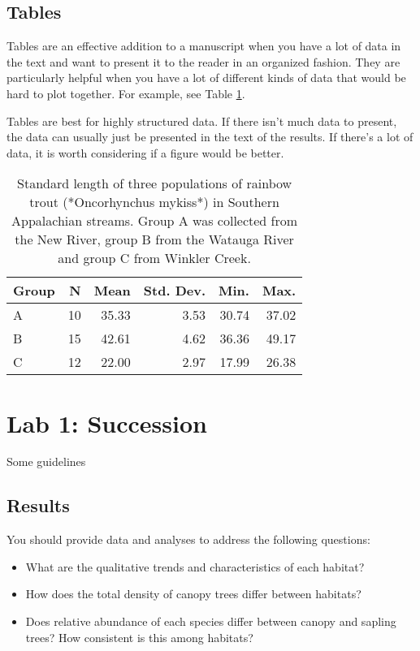 \documentclass[]{book}
\providecommand{\tightlist}{%
  \setlength{\itemsep}{0pt}\setlength{\parskip}{0pt}}
\begin{document}
\section{Tables}\label{tables}

Tables are an effective addition to a manuscript when you have a lot of
data in the text and want to present it to the reader in an organized
fashion. They are particularly helpful when you have a lot of different
kinds of data that would be hard to plot together. For example, see
Table \ref{tab:table1}.

Tables are best for highly structured data. If there isn't much data to
present, the data can usually just be presented in the text of the
results. If there's a lot of data, it is worth considering if a figure
would be better.

\begin{table}

\caption{\label{tab:table1}Standard length of three populations of rainbow trout (*Oncorhynchus mykiss*) in Southern Appalachian streams.  Group A was collected from the New River, group B from the Watauga River and group C from Winkler Creek.}
\centering
\begin{tabular}[t]{lrrrrr}
\toprule
Group & N & Mean & Std. Dev. & Min. & Max.\\
\midrule
A & 10 & 35.33 & 3.53 & 30.74 & 37.02\\
B & 15 & 42.61 & 4.62 & 36.36 & 49.17\\
C & 12 & 22.00 & 2.97 & 17.99 & 26.38\\
\bottomrule
\end{tabular}
\end{table}

\chapter{Lab 1: Succession}\label{lab1}

Some guidelines

\section{Results}\label{results-2}

You should provide data and analyses to address the following questions:

\begin{itemize}
\tightlist
\item
  What are the qualitative trends and characteristics of each habitat?
\item
  How does the total density of canopy trees differ between habitats?
\item
  Does relative abundance of each species differ between canopy and
  sapling trees? How consistent is this among habitats?
\end{itemize}
\end{document}
